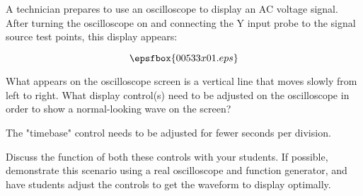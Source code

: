 

A technician prepares to use an oscilloscope to display an AC voltage signal.  After turning the oscilloscope on and connecting the Y input probe to the signal source test points, this display appears:

$$\epsfbox{00533x01.eps}$$

What appears on the oscilloscope screen is a vertical line that moves slowly from left to right.  What display control(s) need to be adjusted on the oscilloscope in order to show a normal-looking wave on the screen?







The "timebase" control needs to be adjusted for fewer seconds per division.







Discuss the function of both these controls with your students.  If possible, demonstrate this scenario using a real oscilloscope and function generator, and have students adjust the controls to get the waveform to display optimally.




